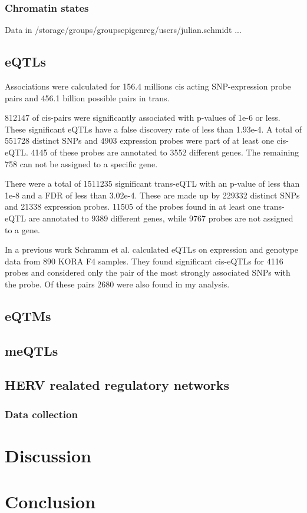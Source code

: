 \documentclass[a4paper,12pt]{article}
\begin{document}
\subsubsection{Chromatin states}
Data in /storage/groups/groups\textunderscore epigenreg/users/julian.schmidt ...

\subsection{eQTLs}
Associations were calculated for 156.4 millions cis acting SNP-expression probe pairs and 456.1 billion possible pairs in trans. 

812147 of cis-pairs were significantly associated with p-values of 1e-6 or less. These significant eQTLs have a false discovery rate of less than 1.93e-4. A total of 551728 distinct SNPs and 4903 expression probes were part of at least one cis-eQTL. 4145 of these probes are annotated to 3552 different genes. The remaining 
758 can not be assigned to a specific gene.

There were a total of 1511235 significant trans-eQTL with an p-value of less than 1e-8 and a FDR of less than 3.02e-4. These are made up by 229332 distinct SNPs and 21338 expression probes. 11505 of the probes found in at least one trans-eQTL are annotated to 9389 different genes, while 9767 probes are not assigned to a gene.

In a previous work Schramm et al. \cite{} calculated eQTLs on expression and genotype data from 890 KORA F4 samples. They found significant cis-eQTLs for 4116 probes and considered only the pair of the most strongly associated SNPs with the probe. Of these pairs 2680 were also found in my analysis. 

\subsection{eQTMs}

\subsection{meQTLs}

\subsection{HERV realated regulatory networks}
\subsubsection{Data collection}


\newpage
\section{Discussion}

\newpage
\section{Conclusion}

\newpage
{}

\end{document}
